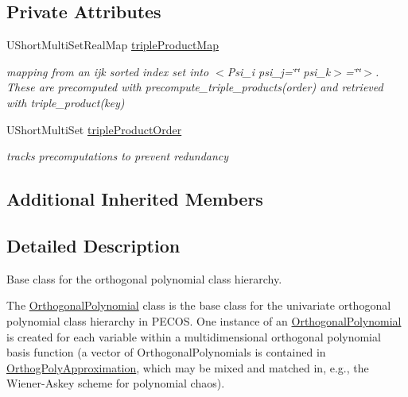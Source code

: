 \subsection*{Private Attributes}
\begin{DoxyCompactItemize}
\item 
U\+Short\+Multi\+Set\+Real\+Map \hyperlink{classPecos_1_1OrthogonalPolynomial_aece1e68316cdaf6be06745c62046c6ec}{triple\+Product\+Map}\label{classPecos_1_1OrthogonalPolynomial_aece1e68316cdaf6be06745c62046c6ec}

\begin{DoxyCompactList}\small\item\em mapping from an ijk sorted index set into $<$\+Psi\+\_\+i psi\+\_\+j=\char`\"{}\char`\"{} psi\+\_\+k$>$=\char`\"{}\char`\"{}$>$. These are precomputed with precompute\+\_\+triple\+\_\+products(order) and retrieved with triple\+\_\+product(key) \end{DoxyCompactList}\item 
U\+Short\+Multi\+Set \hyperlink{classPecos_1_1OrthogonalPolynomial_a22ebc8368302d88c43e62e9075f429d0}{triple\+Product\+Order}\label{classPecos_1_1OrthogonalPolynomial_a22ebc8368302d88c43e62e9075f429d0}

\begin{DoxyCompactList}\small\item\em tracks precomputations to prevent redundancy \end{DoxyCompactList}\end{DoxyCompactItemize}
\subsection*{Additional Inherited Members}


\subsection{Detailed Description}
Base class for the orthogonal polynomial class hierarchy. 

The \hyperlink{classPecos_1_1OrthogonalPolynomial}{Orthogonal\+Polynomial} class is the base class for the univariate orthogonal polynomial class hierarchy in P\+E\+C\+OS. One instance of an \hyperlink{classPecos_1_1OrthogonalPolynomial}{Orthogonal\+Polynomial} is created for each variable within a multidimensional orthogonal polynomial basis function (a vector of Orthogonal\+Polynomials is contained in \hyperlink{classPecos_1_1OrthogPolyApproximation}{Orthog\+Poly\+Approximation}, which may be mixed and matched in, e.\+g., the Wiener-\/\+Askey scheme for polynomial chaos). 

